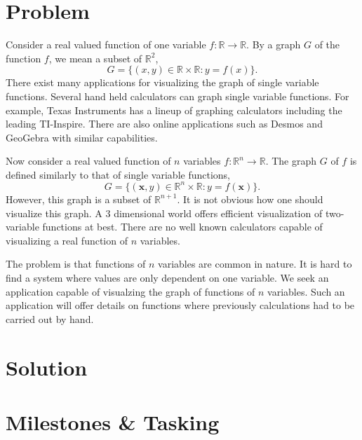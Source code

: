 \documentclass{article}
\newcommand{\makevspace}{\vspace{0.5cm}}
\begin{document}
 {\Large

\section{Problem}
Consider a real valued function of one variable $f:\mathbb{R} \to \mathbb{R}$. By a 
graph $G$ of the function $f$, we mean a subset of $\mathbb{R}^2$,
\[
	G = \{ (x, y) \in \mathbb{R} \times \mathbb{R} : y = f(x) \}.	
\]
There exist many applications for visualizing the graph of single variable functions.
Several hand held calculators can graph single variable functions. 
For example, Texas Instruments has a lineup of graphing calculators including
the leading TI-Inspire. 
There are also online applications such as Desmos and GeoGebra with similar capabilities.

\makevspace

Now consider a real valued function of $n$ variables $f:\mathbb{R}^n \to \mathbb{R}$.
The graph $G$ of $f$ is defined similarly to that of single variable functions,
\[
	G = \{ (\mathbf{x}, y) \in \mathbb{R}^n \times \mathbb{R} : y = f(\mathbf{x}) \}.	
\]
However, this graph is a subset of $\mathbb{R}^{n+1}$.
It is not obvious how one should visualize this graph.
A 3 dimensional world offers efficient visualization of two-variable functions at best. 
There are no well known calculators capable of visualizing a real function of $n$ variables.

\makevspace

The problem is that functions of $n$ variables are common in nature. 
It is hard to find a system where values are only dependent on one variable. 
We seek an application capable of visualzing the graph of functions of $n$ variables.
Such an application will offer details on functions where previously calculations had to 
be carried out by hand.

\newpage
\section{Solution}

\newpage
\section{Milestones \& Tasking}

\newpage
}
\end{document}
